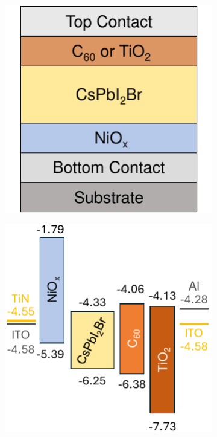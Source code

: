 \begin{figure}[htbp]
    \centering
    \begin{subfigure}[t]{0.35\textwidth} %
        \centering
        \includegraphics[width=\textwidth]{chapters/material_properties/images/stack_cross_section.pdf} %
        \caption{}
        \label{}
    \end{subfigure}
    \hspace{1cm}
    \begin{subfigure}[t]{0.4\textwidth} %
        \centering
        \includegraphics[width=\textwidth]{chapters/material_properties/images/energy_levels_all.pdf} %
        \caption{}
        \label{}
    \end{subfigure}
    

\end{figure}
